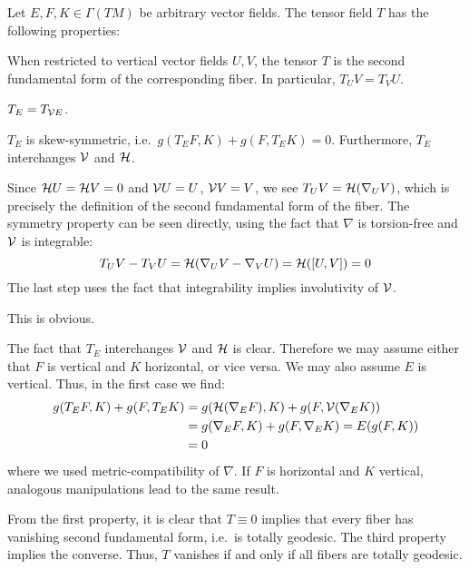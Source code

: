 \begin{lem}
	Let $E,F,K\in\Gamma(TM)$ be arbitrary vector fields. The tensor field $T$ has the following properties:
	\begin{numberedlist}
		\item When restricted to vertical vector fields $U,V$, the tensor $T$ is the second fundamental form of the corresponding fiber. In particular, $T_U V=T_V U$.
		\item $T_E=T_{\mathcal{V} E}$.
		\item $T_E$ is skew-symmetric, i.e.~$g(T_E F,K)+g(F,T_E K)=0$. Furthermore, $T_E$ interchanges $\mathcal{V}$ and $\mathcal{H}$.
	\end{numberedlist}
\end{lem}
\begin{myproof}\leavevmode
	\begin{numberedlist}
		\item Since $\mathcal{H} U=\mathcal{H} V=0$ and $\mathcal{V} U=U$, $\mathcal{V} V=V$, we see $T_U V=\mathcal{H}(\nabla_U V)$, which is precisely the definition of the second fundamental form of the fiber. The symmetry property can be seen directly, using the fact that $\nabla$ is torsion-free and $\mathcal{V}$ is integrable:
		\begin{equation*}
			T_U V-T_V U=\mathcal{H}(\nabla_U V-\nabla_V U)=\mathcal{H}([U,V])=0
		\end{equation*}
		The last step uses the fact that integrability implies involutivity of $\mathcal{V}$.
		\item This is obvious.
		\item The fact that $T_E$ interchanges $\mathcal{V}$ and $\mathcal{H}$ is clear. Therefore we may assume either that $F$ is vertical and $K$ horizontal, or vice versa. We may also assume $E$ is vertical. Thus, in the first case we find:
		\begin{align*}
			g(T_EF, K)+g(F,T_EK)&=g(\mathcal{H}(\nabla_E F),K)+g(F,\mathcal{V}(\nabla_E K))\\
			&=g(\nabla_E F,K)+g(F,\nabla_E K)=E(g(F,K))\\
			&=0
		\end{align*}
		where we used metric-compatibility of $\nabla$. If $F$ is horizontal and $K$ vertical, analogous manipulations lead to the same result.
	\end{numberedlist}
\end{myproof}

From the first property, it is clear that $T\equiv 0$ implies that every fiber has vanishing second fundamental form, i.e.~is totally geodesic. The third property implies the converse. Thus, $T$ vanishes if and only if all fibers are totally geodesic.

